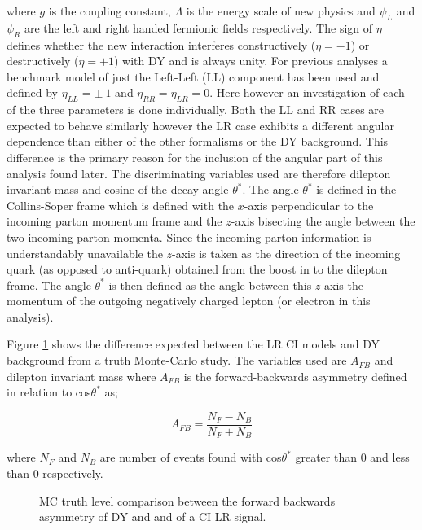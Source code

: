         where $g$ is the coupling constant, $\Lambda$ is the energy scale of new physics and $\psi_{L}$ and $\psi_{R}$ are the left and right handed fermionic fields respectively. The sign of $\eta$ defines whether the new interaction interferes constructively ($\eta = -1$) or destructively ($\eta = +1$) with DY and is always unity. For previous analyses \cite{PhysRevLett.103.191803,PhysRevLett.96.211801,PhysRevD.87.015010} a benchmark model of just the Left-Left (LL) component has been used and defined by $\eta_{LL} = \pm~1$ and $\eta_{RR} = \eta_{LR} = 0$. Here however an investigation of each of the three parameters is done individually. Both the LL and RR cases are expected to behave similarly however the LR case exhibits a different angular dependence than either of the other formalisms or the DY background. This difference is the primary reason for the inclusion of the angular part of this analysis found later. The discriminating variables used are therefore dilepton invariant mass and cosine of the decay angle $\theta^{*}$. The angle $\theta^{*}$ is defined in the Collins-Soper frame \cite{PhysRevD.16.2219} which is defined with the $x$-axis perpendicular to the incoming parton momentum frame and the $z$-axis bisecting the angle between the two incoming parton momenta. Since the incoming parton information is understandably unavailable the $z$-axis is taken as the direction of the incoming quark (as opposed to anti-quark) obtained from the boost in to the dilepton frame. The angle $\theta^{*}$ is then defined as the angle between this $z$-axis the momentum of the outgoing negatively charged lepton (or electron in this analysis).

        Figure \ref{fig:theoryAFB} shows the difference expected between the LR CI models and DY background from a truth Monte-Carlo study. The variables used are $A_{FB}$ and dilepton invariant mass where $A_{FB}$ is the forward-backwards asymmetry defined in relation to cos$\theta^{*}$ as;

        \begin{equation}
            A_{FB} = 
                \frac{N_{F} - N_{B}}{N_{F} + N_{B}}
            \label{eq:AFB}
        \end{equation}

        where $N_{F}$ and $N_{B}$ are number of events found with cos$\theta^{*}$ greater than 0 and less than 0 respectively.
        
        \begin{figure}[h]
            \begin{center}
            \end{center}
            \caption{MC truth level comparison between the forward backwards asymmetry of DY and and of a CI LR signal.}
            \label{fig:theoryAFB}
        \end{figure}

